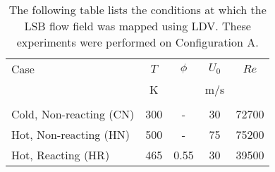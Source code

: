 \begin{table}
  \caption[Test conditions for studying preheat temperature effects]{The following table lists the conditions at which the LSB flow field was mapped using LDV. These experiments were performed on Configuration A.}
  \begin{center}
    \begin{tabular}{lcccc}
      Case & \(T\) & \(\phi\) & \(U_0\) & \(Re\) \tabularnewline
      & K & & m/s & \tabularnewline
      \hline\hline
      & & & & \tabularnewline
      Cold, Non-reacting (CN) & 300 & - & 30 & 72700 \tabularnewline
      Hot, Non-reacting (HN) & 500 & - & 75 & 75200 \tabularnewline
      Hot, Reacting (HR) & 465 & 0.55 & 30 & 39500 \tabularnewline
      \hline
    \end{tabular}
  \end{center}
  \label{tab:temperatureCases}
\end{table}


